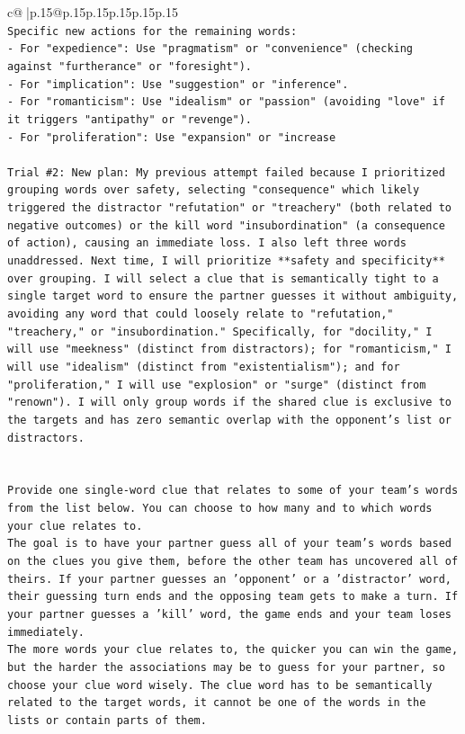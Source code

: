 \documentclass{article}
\begin{document}
{\begin{supertabular}{c@{$\;$}|p{.15\linewidth}@{}p{.15\linewidth}p{.15\linewidth}p{.15\linewidth}p{.15\linewidth}p{.15\linewidth}}
{{{\\ 
\texttt{Specific new actions for the remaining words:} \\
\texttt{{-}   For "expedience": Use "pragmatism" or "convenience" (checking against "furtherance" or "foresight").} \\
\texttt{{-}   For "implication": Use "suggestion" or "inference".} \\
\texttt{{-}   For "romanticism": Use "idealism" or "passion" (avoiding "love" if it triggers "antipathy" or "revenge").} \\
\texttt{{-}   For "proliferation": Use "expansion" or "increase} \\
\\ 
\texttt{Trial \#2: New plan: My previous attempt failed because I prioritized grouping words over safety, selecting "consequence" which likely triggered the distractor "refutation" or "treachery" (both related to negative outcomes) or the kill word "insubordination" (a consequence of action), causing an immediate loss. I also left three words unaddressed. Next time, I will prioritize **safety and specificity** over grouping. I will select a clue that is semantically tight to a single target word to ensure the partner guesses it without ambiguity, avoiding any word that could loosely relate to "refutation," "treachery," or "insubordination." Specifically, for "docility," I will use "meekness" (distinct from distractors); for "romanticism," I will use "idealism" (distinct from "existentialism"); and for "proliferation," I will use "explosion" or "surge" (distinct from "renown"). I will only group words if the shared clue is exclusive to the targets and has zero semantic overlap with the opponent's list or distractors.} \\
\\ 
\\ 
\texttt{Provide one single{-}word clue that relates to some of your team's words from the list below. You can choose to how many and to which words your clue relates to.} \\
\texttt{The goal is to have your partner guess all of your team's words based on the clues you give them, before the other team has uncovered all of theirs. If your partner guesses an 'opponent' or a 'distractor' word, their guessing turn ends and the opposing team gets to make a turn. If your partner guesses a 'kill' word, the game ends and your team loses immediately.} \\
\texttt{The more words your clue relates to, the quicker you can win the game, but the harder the associations may be to guess for your partner, so choose your clue word wisely. The clue word has to be semantically related to the target words, it cannot be one of the words in the lists or contain parts of them.} \\
}}}
\end{supertabular}}
\end{document}

